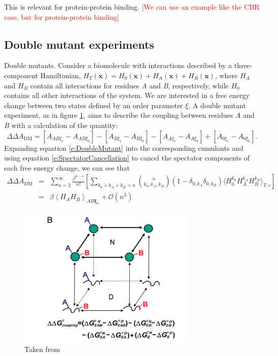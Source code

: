 \documentclass[%
 preprint,
 amsmath,amssymb,
 aps,
]{revtex4-1}
\newcommand{\warning}[1]{{\textsf{{\textcolor{red}{{[#1]}{}}}}}}
\renewcommand{\vec}[1]{{\mathbf{#1}}}
\begin{document}
 This is relevant for protein-protein binding.  
 \warning{We can use an example like the CBR case, but for protein-protein binding}
 
 
 
 \subsection{Double mutant experiments}
 Double mutants.  Consider a biomolecule with interactions described by a three-component Hamiltonian,
 $H_{T} \left( \vec{x} \right) = H_0 \left( \vec{x} \right) + H_A \left( \vec{x} \right) + H_B \left( \vec{x} \right)$, where $H_A$ and $H_B$ contain all interactions for residues \emph{A} and \emph{B}, respectively, while $H_0$ contains all other interactions of the system.   We are interested in a free energy change between two states defined by an order parameter $\xi$.  A double mutant experiment, as in figure \ref{f:DoubleMutant}, aims to describe the coupling between residues \emph{A} and \emph{B} with a calculation of the quantity:
 \begin{equation}
 \Delta \Delta A_{\text{DM}} =  \left[ A_{AB\xi_1} - A_{AB\xi_0} \right] - \left[ A_{B\xi_1} - A_{B\xi_0} \right]
 - \left[ A_{A\xi_1} - A_{A\xi_0} \right] + \left[ A_{0\xi_1} - A_{0\xi_0} \right]. 
 \label{e:DoubleMutant}
 \end{equation}
 Expanding equation \ref{e:DoubleMutant} into the corresponding cumulants and using equation \ref{e:SpectatorCancellation} to cancel the spectator components of each free energy change, we can see that
 \begin{eqnarray}
  \Delta \Delta A_{\text{DM}} &=& 
   \sum_{n=2}^{\infty}  \frac{\beta^{n-1}}{n!} 
\left[
 \sum_{k_0+k_A+k_B=n} 
{ n \choose k_0,k_A,k_B}  \left( 1- \delta_{0,k_A} \delta_{0,k_B} \right) \langle  H_0^{k_0} H_A^{k_A} H_B^{k_B} 
\rangle_{T,c} \right]
\nonumber \\ 
& = & 
\beta \left \langle H_A H_B \right \rangle_{AB\vec{\xi}_1} + \mathcal{O} \left( n^3 \right) 
 \label{e:DoubleMutantExpansion}
 \end{eqnarray}
 
\begin{figure}
 \centering
  \includegraphics[width=8.6cm]{doubleMutant.png}
\caption{\label{f:DoubleMutant} { Taken from \cite{Cho2014} }}
\end{figure}
\end{document}
